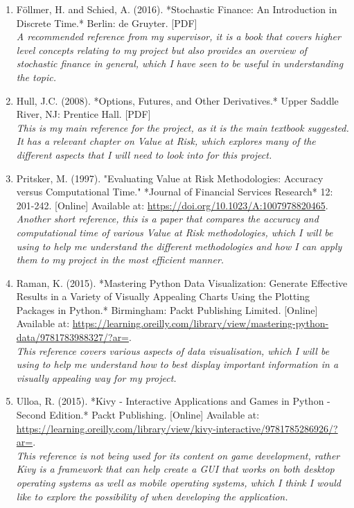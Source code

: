 \documentclass{article}
\begin{document}
\begin{small}
\begin{enumerate}
  \item\label{ref5} Föllmer, H. and Schied, A. (2016). *Stochastic Finance: An Introduction in Discrete Time.* Berlin: de Gruyter. [PDF]
  \\\textit{A recommended reference from my supervisor, it is a book that covers higher level concepts relating to my project but also provides an overview of stochastic finance in general, which I have seen to be useful in understanding the topic.}
  
  \item\label{ref6} Hull, J.C. (2008). *Options, Futures, and Other Derivatives.* Upper Saddle River, NJ: Prentice Hall. [PDF]
  \\\textit{This is my main reference for the project, as it is the main textbook suggested. It has a relevant chapter on Value at Risk, which explores many of the different aspects that I will need to look into for this project.}

  \item\label{ref7} Pritsker, M. (1997). "Evaluating Value at Risk Methodologies: Accuracy versus Computational Time." *Journal of Financial Services Research* 12: 201-242. [Online] Available at: \url{https://doi.org/10.1023/A:1007978820465}.
  \\\textit{Another short reference, this is a paper that compares the accuracy and computational time of various Value at Risk methodologies, which I will be using to help me understand the different methodologies and how I can apply them to my project in the most efficient manner.}

  \item\label{ref8} Raman, K. (2015). *Mastering Python Data Visualization: Generate Effective Results in a Variety of Visually Appealing Charts Using the Plotting Packages in Python.* Birmingham: Packt Publishing Limited. [Online] Available at: \url{https://learning.oreilly.com/library/view/mastering-python-data/9781783988327/?ar=}.
  \\\textit{This reference covers various aspects of data visualisation, which I will be using to help me understand how to best display important information in a visually appealing way for my project.}

  \item\label{ref9} Ulloa, R. (2015). *Kivy - Interactive Applications and Games in Python - Second Edition.* Packt Publishing. [Online] Available at: \url{https://learning.oreilly.com/library/view/kivy-interactive/9781785286926/?ar=}.
  \\\textit{This reference is not being used for its content on game development, rather Kivy is a framework that can help create a GUI that works on both desktop operating systems as well as mobile operating systems, which I think I would like to explore the possibility of when developing the application.}


\end{enumerate}
\end{small}
\end{document}
